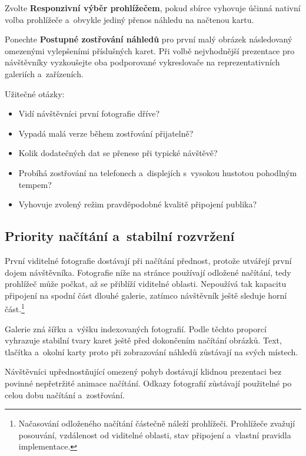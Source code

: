 \documentclass[11pt,a4paper]{article}
\newcommand{\ui}[1]{\textbf{#1}}
\begin{document}
Zvolte \ui{Responzivní výběr prohlížečem}, pokud sbírce vyhovuje účinná nativní
volba prohlížeče a~obvykle jediný přenos náhledu na načtenou kartu.

Ponechte \ui{Postupné zostřování náhledů} pro první malý obrázek následovaný
omezenými vylepšeními příslušných karet. Při volbě nejvhodnější prezentace pro
návštěvníky vyzkoušejte oba podporované vykreslovače na reprezentativních
galeriích a~zařízeních.

Užitečné otázky:

\begin{itemize}
  \item Vidí návštěvníci první fotografie dříve?
  \item Vypadá malá verze během zostřování přijatelně?
  \item Kolik dodatečných dat se přenese při typické návštěvě?
  \item Probíhá zostřování na telefonech a~displejích s~vysokou hustotou
  pohodlným tempem?
  \item Vyhovuje zvolený režim pravděpodobné kvalitě připojení publika?
\end{itemize}

\subsection{Priority načítání a~stabilní rozvržení}

První viditelné fotografie dostávají při načítání přednost, protože utvářejí
první dojem návštěvníka. Fotografie níže na stránce používají odložené načítání,
tedy prohlížeč může počkat, až se přiblíží viditelné oblasti. Nepoužívá tak
kapacitu připojení na spodní část dlouhé galerie, zatímco návštěvník ještě
sleduje horní část.\footnote{Načasování odloženého načítání částečně náleží
prohlížeči. Prohlížeče zvažují posouvání, vzdálenost od viditelné oblasti, stav
připojení a~vlastní pravidla implementace.}

Galerie zná šířku a~výšku indexovaných fotografií. Podle těchto proporcí
vyhrazuje stabilní tvary karet ještě před dokončením načítání obrázků. Text,
tlačítka a~okolní karty proto při zobrazování náhledů zůstávají na svých
místech.

Návštěvníci upřednostňující omezený pohyb dostávají klidnou prezentaci bez
povinné nepřetržité animace načítání. Odkazy fotografií zůstávají použitelné po
celou dobu načítání a~zostřování.
\end{document}
